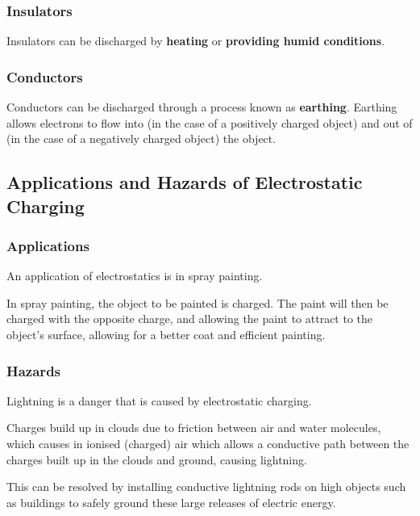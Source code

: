 \documentclass[../main.tex]{subfiles}
\begin{document}
		\subsubsection{Insulators}
		Insulators can be discharged by \textbf{heating} or \textbf{providing humid conditions}.
		
		\subsubsection{Conductors}
		Conductors can be discharged through a process known as \textbf{earthing}. Earthing allows electrons to flow into (in the case of a positively charged object) and out of (in the case of a negatively charged object) the object.
		\subsection{Applications and Hazards of Electrostatic Charging }
		\subsubsection{Applications}
		An application of electrostatics is in spray painting.
		
		In spray painting, the object to be painted is charged. The paint will then be charged with the opposite charge, and allowing the paint to attract to the object's surface, allowing for a better coat and efficient painting.
		
		\subsubsection{Hazards}
		Lightning is a danger that is caused by electrostatic charging.
		
		Charges build up in clouds due to friction between air and water molecules, which causes in ionised (charged) air which allows a conductive path between the charges built up in the clouds and ground, causing lightning.
		
		This can be resolved by installing conductive lightning rods on high objects such as buildings to safely ground these large releases of electric energy.
\end{document}
